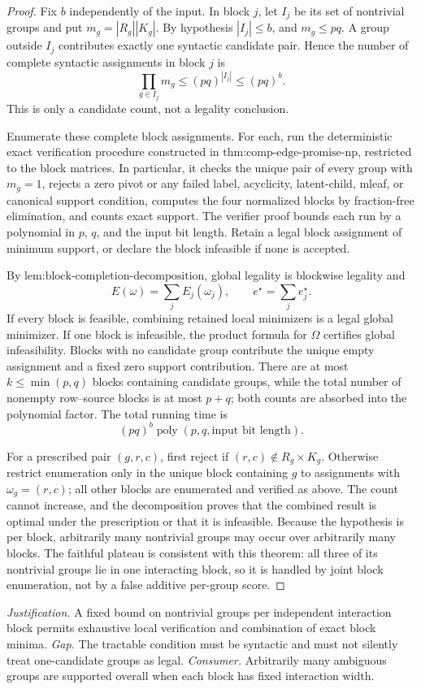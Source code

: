 \documentclass{article}
\begin{document}
\begin{proof}
Fix \(b\) independently of the input. In block \(j\), let \(I_j\) be its set of nontrivial groups and put \(m_g=|R_g||K_g|\). By hypothesis \(|I_j|\le b\), and \(m_g\le pq\). A group outside \(I_j\) contributes exactly one syntactic candidate pair. Hence the number of complete syntactic assignments in block \(j\) is
\[
\prod_{g\in I_j}m_g\le(pq)^{|I_j|}\le(pq)^b.
\]
This is only a candidate count, not a legality conclusion.

Enumerate these complete block assignments. For each, run the deterministic exact verification procedure constructed in \(\text{thm:comp-edge-promise-np}\), restricted to the block matrices. In particular, it checks the unique pair of every group with \(m_g=1\), rejects a zero pivot or any failed label, acyclicity, latent-child, mleaf, or canonical support condition, computes the four normalized blocks by fraction-free elimination, and counts exact support. The verifier proof bounds each run by a polynomial in \(p\), \(q\), and the input bit length. Retain a legal block assignment of minimum support, or declare the block infeasible if none is accepted.

By \(\text{lem:block-completion-decomposition}\), global legality is blockwise legality and
\[
E(\omega)=\sum_jE_j(\omega_j),\qquad e^\star=\sum_je_j^\star.
\]
If every block is feasible, combining retained local minimizers is a legal global minimizer. If one block is infeasible, the product formula for \(\Omega\) certifies global infeasibility. Blocks with no candidate group contribute the unique empty assignment and a fixed zero support contribution. There are at most \(k\le\min(p,q)\) blocks containing candidate groups, while the total number of nonempty row--source blocks is at most \(p+q\); both counts are absorbed into the polynomial factor. The total running time is
\[
(pq)^b\operatorname{poly}(p,q,\text{input bit length}).
\]

For a prescribed pair \((g,r,c)\), first reject if \((r,c)\notin R_g\times K_g\). Otherwise restrict enumeration only in the unique block containing \(g\) to assignments with \(\omega_g=(r,c)\); all other blocks are enumerated and verified as above. The count cannot increase, and the decomposition proves that the combined result is optimal under the prescription or that it is infeasible. Because the hypothesis is per block, arbitrarily many nontrivial groups may occur over arbitrarily many blocks. The faithful plateau is consistent with this theorem: all three of its nontrivial groups lie in one interacting block, so it is handled by joint block enumeration, not by a false additive per-group score.
\end{proof}
\par\smallskip\noindent \textit{Justification.} A fixed bound on nontrivial groups per independent interaction block permits exhaustive local verification and combination of exact block minima. \textit{Gap.} The tractable condition must be syntactic and must not silently treat one-candidate groups as legal. \textit{Consumer.} Arbitrarily many ambiguous groups are supported overall when each block has fixed interaction width.
\end{document}
